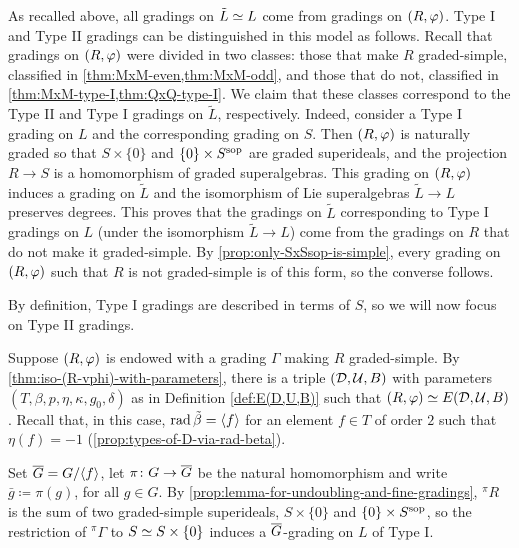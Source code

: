 As recalled above, all gradings on $\tilde L \simeq L$ come from gradings on $(R, \varphi)$. 
Type I and Type II gradings can be distinguished in this model as follows. 
Recall that gradings on $(R, \varphi)$ were divided in two classes: those that make $R$ graded-simple, classified in \cref{thm:MxM-even,thm:MxM-odd}, and those that do not, classified in \cref{thm:MxM-type-I,thm:QxQ-type-I}. 
We claim that these classes correspond to the Type II and Type I gradings on $\tilde L$, respectively. 
Indeed, consider a Type I grading on $L$ and the corresponding grading on $S$. 
Then $(R, \varphi)$ is naturally graded so that $S\times \{ 0 \}$ and $\{0\} \times S^{\mathrm{sop}}$ are graded superideals, and the projection $R \to S$ is a homomorphism of graded superalgebras. 
This grading on $(R, \varphi)$ induces a grading on $\tilde L$ and the isomorphism of Lie superalgebras $\tilde L \to L$ preserves degrees. 
This proves that the gradings on $\tilde L$ corresponding to Type I gradings on $L$ (under the isomorphism $\tilde L \to L$) come from the gradings on $R$ that do not make it graded-simple. 
By \cref{prop:only-SxSsop-is-simple}, every grading on $(R, \varphi)$ such that $R$ is not graded-simple is of this form, so the converse follows. 

By definition, Type I gradings are described in terms of $S$, so we will now focus on Type II gradings. 

Suppose $(R, \varphi)$ is endowed with a grading $\Gamma$ making $R$ graded-simple. 
By \cref{thm:iso-(R-vphi)-with-parameters}, there is a triple $(\mathcal{D}, \mathcal U, B)$ with parameters $(T, \beta, p, \eta, \kappa, g_0, \delta)$ as in Definition \ref{def:E(D,U,B)} such that $(R, \varphi) \simeq E(\mathcal{D}, \mathcal U, B)$. 
Recall that, in this case, $\operatorname{rad} \tilde\beta = \langle f \rangle$ for an element $f\in T$ of order $2$ such that $\eta(f) = -1$ (\cref{prop:types-of-D-via-rad-beta}). 

Set $\barr G = G/\langle f \rangle$, let  $\pi\from G\to \barr G$ be the natural homomorphism and write $\bar g \coloneqq \pi(g)$, for all $g\in G$. 
By \cref{prop:lemma-for-undoubling-and-fine-gradings}, ${}^\pi R$ is the sum of two graded-simple superideals, $S\times \{ 0 \}$ and $\{0\} \times S^{\mathrm{sop}}$, so the restriction of ${}^\pi \Gamma$ to $S \simeq S\times \{ 0 \}$ induces a $\barr G$-grading on $L$ of Type I. 

